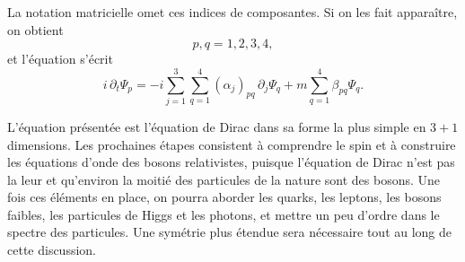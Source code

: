La notation matricielle omet ces indices de composantes. Si on les fait apparaître, on obtient
\begin{equation}
p,q=1,2,3,4,
\end{equation}
et l’équation s’écrit
\begin{equation}
i\,\partial_t\Psi_p
=
-i\sum_{j=1}^{3}\sum_{q=1}^{4}
(\alpha_j)_{pq}\,\partial_j\Psi_q
+m\sum_{q=1}^{4}\beta_{pq}\Psi_q.
\end{equation}

\begin{classroomqa}
\end{classroomqa}

L’équation présentée est l’équation de Dirac dans sa forme la plus simple en \(3+1\) dimensions. Les prochaines étapes consistent à comprendre le spin et à construire les équations d’onde des bosons relativistes, puisque l’équation de Dirac n’est pas la leur et qu’environ la moitié des particules de la nature sont des bosons. Une fois ces éléments en place, on pourra aborder les quarks, les leptons, les bosons faibles, les particules de Higgs et les photons, et mettre un peu d’ordre dans le spectre des particules. Une symétrie plus étendue sera nécessaire tout au long de cette discussion.
